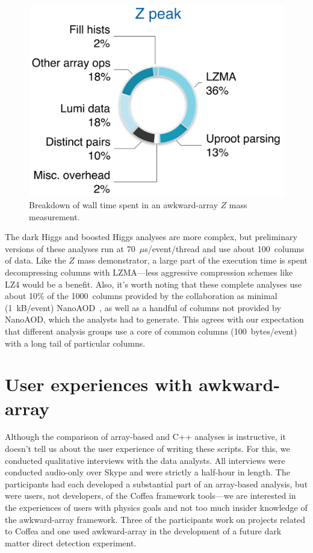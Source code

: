 \documentclass[a4paper]{jpconf}
\begin{document}
\begin{figure}
\begin{center}
\includegraphics[width=0.35\linewidth]{zpeak-performance-breakdown.png}
\end{center}

\caption{Breakdown of wall time spent in an awkward-array $Z$ mass measurement. \label{fig:zpeak}}
\end{figure}

The dark Higgs and boosted Higgs analyses are more complex, but preliminary versions of these analyses run at 70~$\mu$s/event/thread and use about 100~columns of data. Like the $Z$ mass demonstrator, a large part of the execution time is spent decompressing columns with LZMA---less aggressive compression schemes like LZ4 would be a benefit. Also, it's worth noting that these complete analyses use about 10\% of the 1000~columns provided by the collaboration as minimal (1~kB/event) NanoAOD~\cite{nanoaod}, as well as a handful of columns not provided by NanoAOD, which the analysts had to generate. This agrees with our expectation that different analysis groups use a core of common columns (100~bytes/event) with a long tail of particular columns.

\section{User experiences with awkward-array}

Although the comparison of array-based and C++ analyses is instructive, it doesn't tell us about the user experience of writing these scripts. For this, we conducted qualitative interviews with the data analysts. All interviews were conducted audio-only over Skype and were strictly a half-hour in length. The participants had each developed a substantial part of an array-based analysis, but were users, not developers, of the Coffea framework tools---we are interested in the experiences of users with physics goals and not too much insider knowledge of the awkward-array framework. Three of the participants work on projects related to Coffea and one used awkward-array in the development of a future dark matter direct detection experiment.
\end{document}
